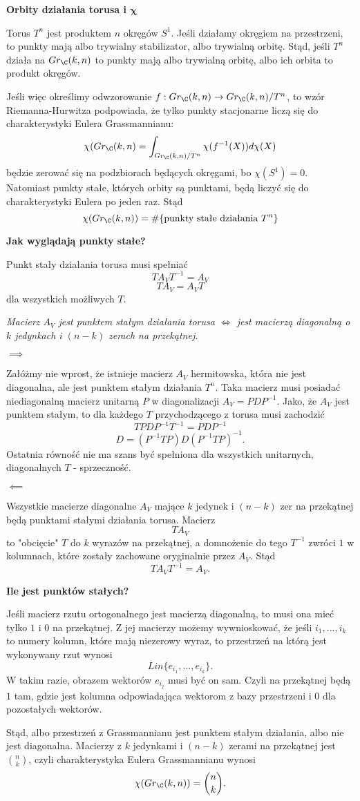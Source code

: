 \textbf{\color{green}Orbity działania torusa i $\boldsymbol{\chi}$}

Torus $T^n$ jest produktem $n$ okręgów $S^1$. Jeśli działamy okręgiem na przestrzeni, to punkty mają albo trywialny stabilizator, albo trywialną orbitę. Stąd, jeśli $T^n$ działa na $Gr_{\C}(k,n)$ to punkty mają albo trywialną orbitę, albo ich orbita to produkt okręgów.

Jeśli więc określimy odwzorowanie $f:Gr_{\C}(k,n)\to Gr_{\C}(k,n)/T^n$, to wzór Riemanna-Hurwitza podpowiada, że tylko punkty stacjonarne liczą się do charakterystyki Eulera Grassmannianu:
$$\chi(Gr_{\C}(k,n)=\int_{Gr_{\C}(k,n)/T^n}\chi(f^{-1}(X))d\chi(X)$$
będzie zerować się na podzbiorach będących okręgami, bo $\chi(S^1)=0$. Natomiast punkty stałe, których orbity są punktami, będą liczyć się do charakterystyki Eulera po jeden raz. Stąd
$$\chi( Gr_{\C}(k,n))=\#\{\text{punkty stałe działania }T^n\}$$

\textbf{\color{green}Jak wyglądają punkty stałe?}

Punkt stały działania torusa musi spełniać
$$TA_VT^{-1}=A_V$$
$$TA_V=A_VT$$
dla wszystkich możliwych $T$.

{\slshape Macierz $A_V$ jest punktem stałym działania torusa $\iff$ jest macierzą diagonalną o $k$ jedynkach i $(n-k)$ zerach na przekątnej.
}

$\implies$

Załóżmy nie wprost, że istnieje macierz $A_V$ hermitowska, która nie jest diagonalna, ale jest punktem stałym działania $T^n$. Taka macierz musi posiadać niediagonalną macierz unitarną $P$ w diagonalizacji $A_V=PDP^{-1}$. 
Jako, że $A_V$ jest punktem stałym, to dla każdego $T$ przychodzącego z torusa musi zachodzić
$$TPDP^{-1}T^{-1}=PDP^{-1}$$
$$D=(P^{-1}TP)D(P^{-1}TP)^{-1}.$$
Ostatnia równość nie ma szans być spełniona dla wszystkich unitarnych, diagonalnych $T$ - sprzeczność.

$\impliedby$

Wszystkie macierze diagonalne $A_V$ mające $k$ jedynek i $(n-k)$ zer na przekątnej będą punktami stałymi działania torusa. Macierz 
$$TA_V$$ 
to "obcięcie" $T$ do $k$ wyrazów na przekątnej, a domnożenie do tego $T^{-1}$ zwróci $1$ w kolumnach, które zostały zachowane oryginalnie przez $A_V$. Stąd 
$$TA_VT^{-1}=A_V.$$

\textbf{\color{green}Ile jest punktów stałych?}

Jeśli macierz rzutu ortogonalnego jest macierzą diagonalną, to musi ona mieć tylko $1$ i $0$ na przekątnej. Z jej macierzy możemy wywnioskować, że jeśli $i_1,...,i_k$ to numery kolumn, które mają niezerowy wyraz, to przestrzeń na którą jest wykonywany rzut wynosi 
$$Lin\{e_{i_1},...,e_{i_k}\}.$$ 
W takim razie, obrazem wektorów $e_{i_j}$ musi być on sam. Czyli na przekątnej będą $1$ tam, gdzie jest kolumna odpowiadająca wektorom z bazy przestrzeni i $0$ dla pozostałych wektorów.

Stąd, albo przestrzeń z Grassmannianu jest punktem stałym działania, albo nie jest diagonalna. Macierzy z $k$ jedynkami i $(n-k)$ zerami na przekątnej jest $\binom{n}{k}$, czyli charakterystyka Eulera Grassmannianu wynosi
$$\chi(Gr_{\C}(k,n))=\binom{n}{k}.$$
